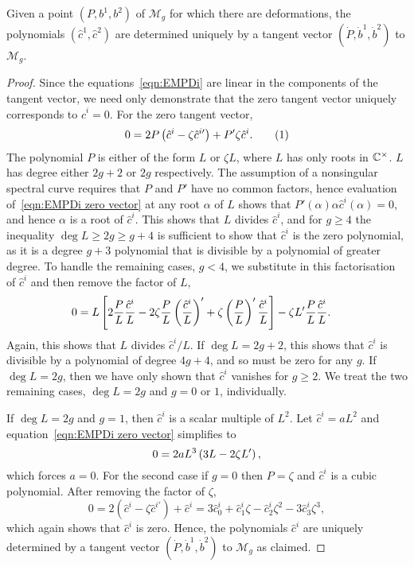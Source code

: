 \documentclass{article}
\begin{document}
\begin{lem}\label{lem:unique cs}
Given a point $(P,b^1,b^2)$ of $\mathcal{M}_g$ for which there are deformations, the polynomials $(\hat{c}^1,\hat{c}^2)$ are determined uniquely by a tangent vector $(\dot P, \dot b^1, \dot b^2)$ to $\mathcal{M}_g$.

\begin{proof}
Since the equations~\eqref{eqn:EMPDi} are linear in the components of the tangent vector, we need only demonstrate that the zero tangent vector uniquely corresponds to $\hat{c}^i = 0$. For the zero tangent vector,
\[
0 = 2P\left( \hat{c}^i - \zeta\hat {c}^{i\prime}\right) + P' \zeta\hat {c}^i.
\labelthis{eqn:EMPDi zero vector}
\]
The polynomial $P$ is either of the form $L$ or $\zeta L$, where $L$ has only roots in $\mathbb{C}^\times$. $L$ has degree either $2g+2$ or $2g$ respectively.
The assumption of a nonsingular spectral curve requires that $P$ and $P'$ have no common factors, hence evaluation of~\eqref{eqn:EMPDi zero vector} at any root $\alpha$ of $L$ shows that $P'(\alpha)\alpha\hat{c}^i(\alpha) = 0$, and hence $\alpha$ is a root of $\hat{c}^i$. This shows that $L$ divides $\hat{c}^i$, and for $g\geq 4$ the inequality $\deg L \geq 2g \geq g+4$ is sufficient to show that $\hat{c}^i$ is the zero polynomial, as it is a degree $g+3$ polynomial that is divisible by a polynomial of greater degree. To handle the remaining cases, $g<4$, we substitute in this factorisation of $\hat{c}^i$ and then remove the factor of $L$,
\begin{align*}
    0 &= L \left [ 2\frac{P}{L}\frac{\hat{c}^i}{L} - 2\zeta\frac{P}{L}\left(\frac{\hat {c}^i}{L}\right)' + \zeta\left(\frac{P}{L}\right)'\frac{\hat {c}^i}{L} \right]
    -\zeta L' \frac{P}{L} \frac{\hat {c}^i}{L}.
\end{align*}
Again, this shows that $L$ divides $\hat{c}^i/L$. If $\deg L = 2g+2$, this shows that $\hat{c}^i$ is divisible by a polynomial of degree $4g+4$, and so must be zero for any $g$. If $\deg L = 2g$, then we have only shown that $\hat{c}^i$ vanishes for $g \geq 2$. We treat the two remaining cases, $\deg L = 2g$ and $g = 0$ or $1$, individually.

If $\deg L = 2g$ and $g = 1$, then $\hat{c}^i$ is a scalar multiple of $L^2$. Let $\hat{c}^i = a L^2$ and equation~\eqref{eqn:EMPDi zero vector} simplifies to
\[
0 = 2a L^3 \left( 3L - 2\zeta L' \right),
\]
which forces $a = 0$. For the second case if $g=0$ then $P=\zeta$ and $\hat{c}^i$ is a cubic polynomial. After removing the factor of $\zeta$,
\[
0
= 2(\hat{c}^i - \zeta\hat{c}^{i\prime}) + \hat{c}^i
= 3\hat{c}^i_0 + \hat{c}^i_1 \zeta - \hat{c}^i_2 \zeta^2 - 3\hat{c}^i_3 \zeta^3,
\]
which again shows that $\hat{c}^i$ is zero. Hence, the polynomials $\hat{c}^i$ are uniquely determined by a tangent vector $(\dot P, \dot b^1, \dot b^2)$ to $\mathcal{M}_g$ as claimed.
\end{proof}
\end{lem}
\end{document}
